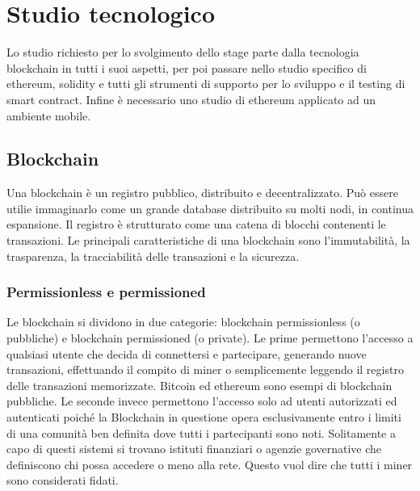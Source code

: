 
\section{Studio tecnologico}
Lo studio richiesto per lo svolgimento dello stage parte dalla tecnologia blockchain in tutti i suoi aspetti, per poi passare nello studio specifico di ethereum, solidity e tutti gli strumenti di supporto per lo sviluppo e il testing di smart contract. Infine è necessario uno studio di ethereum applicato ad un ambiente mobile.

\subsection{Blockchain}
Una blockchain è un registro pubblico, distribuito e decentralizzato. Può essere utilie immaginarlo come un grande database distribuito su molti nodi, in continua espansione. Il registro è strutturato come una catena di blocchi contenenti le transazioni. Le principali caratteristiche di una blockchain sono l’immutabilità, la trasparenza, la tracciabilità delle transazioni e la sicurezza.

\subsubsection{Permissionless e permissioned}
Le blockchain si dividono in due categorie: blockchain permissionless (o pubbliche) e blockchain permissioned (o private). Le prime permettono l’accesso a qualsiasi utente che decida di connettersi e partecipare, generando nuove transazioni, effettuando il compito di miner o semplicemente leggendo il registro delle transazioni memorizzate. Bitcoin ed ethereum sono esempi di blockchain pubbliche.
Le seconde invece permettono l’accesso solo ad utenti autorizzati ed autenticati poiché la Blockchain in questione opera esclusivamente entro i limiti di una comunità ben definita dove tutti i partecipanti sono noti. Solitamente a capo di questi sistemi si trovano istituti finanziari o agenzie governative che definiscono chi possa accedere o meno alla rete. Questo vuol dire che tutti i miner sono considerati fidati.

